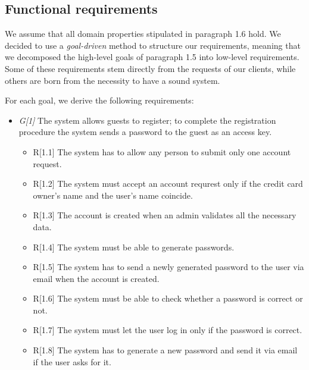 
\subsection{Functional requirements}
We assume that all domain properties stipulated in paragraph 1.6 hold. We decided to use a \textit{goal-driven} method to structure our requirements, meaning that we decomposed the high-level goals of paragraph 1.5 into low-level requirements.
Some of these requirements stem directly from the requests of our clients, while others are born from the necessity to have a sound system.

For each goal, we derive the following requirements:



\begin{itemize}


				\item \textit{G[1]} The system allows guests to register; to complete the registration procedure the system sends a password to the guest as an access key.
					\begin{itemize}
						\item R[1.1] The system has to allow any person to submit only one account request.
						\item R[1.2] The system must accept an account requrest only if the credit card owner's name and the user's name coincide.
						\item R[1.3] The account is created when an admin validates all the necessary data.
						\item R[1.4] The system must be able to generate passwords.
						\item R[1.5] The system has to send a newly generated password to the user via email when the account is created.
						\item R[1.6] The system must be able to check whether a password is correct or not.
						\item R[1.7] The system must let the user log in only if the password is correct. 
						\item R[1.8] The system has to generate a new password and send it via email if the user asks for it.
					\end{itemize}


\end{itemize}

